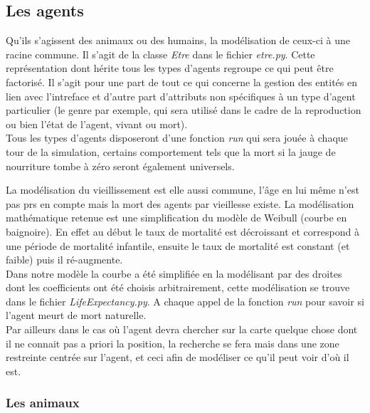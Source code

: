 \documentclass[12pt]{article}
\begin{document}
\begin{itemize}
\begin{itemize}
	\end{itemize}

	\subsection{Les agents}

Qu'ils s'agissent des animaux ou des humains, la modélisation de ceux-ci à 
une racine commune. Il s'agit de la classe \textit{Etre} dans le fichier 
\textit{etre.py}. Cette représentation dont hérite tous les types d'agents 
regroupe ce qui peut être factorisé. Il s'agit pour une part de tout ce qui 
concerne la gestion des entités en lien avec l'intreface et d'autre part 
d'attributs non spécifiques à un type d'agent particulier (le genre par 
exemple, qui sera utilisé dans le cadre de la reproduction ou bien l'état de 
l'agent, vivant ou mort).\\

Tous les types d'agents disposeront d'une fonction \textit{run} qui sera jouée 
à chaque tour de la simulation, certains comportement tels que la mort si la 
jauge de nourriture tombe à zéro seront également universels.

La modélisation du vieillissement est elle aussi commune, l'âge en lui même 
n'est pas prs en compte mais la mort des agents par vieillesse existe. La 
modélisation mathématique retenue est une simplification du modèle de Weibull 
(courbe en baignoire). En effet au début le taux de mortalité est décroissant 
et correspond à une période de mortalité infantile, ensuite le taux de 
mortalité est constant (et faible) puis il ré-augmente.\\

Dans notre modèle la courbe a été simplifiée en la modélisant par des droites 
dont les coefficients ont été choisis arbitrairement, cette modélisation se 
trouve dans le fichier \textit{LifeExpectancy.py}. A chaque appel de la 
fonction \textit{run} pour savoir si l'agent meurt de mort naturelle.\\

Par ailleurs dans le cas où l'agent devra chercher sur la carte quelque chose 
dont il ne connait pas a priori la position, la recherche se fera mais dans 
une zone restreinte centrée sur l'agent, et ceci afin de modéliser ce qu'il 
peut voir d'où il est.

		\subsubsection{Les animaux}


\end{itemize}
\end{document}
